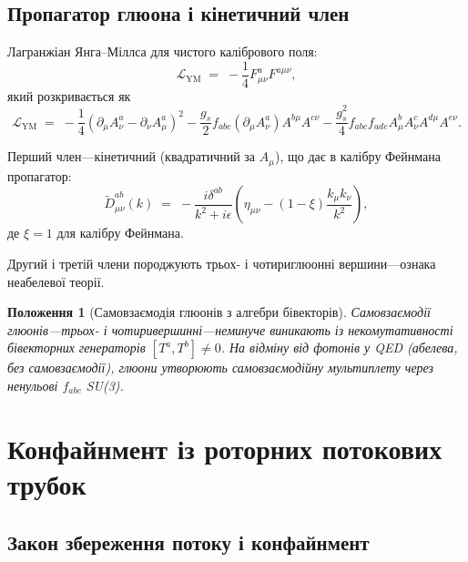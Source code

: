 \documentclass[11pt,a4paper]{article}
\newcommand{\Lag}{\mathcal{L}}
\theoremstyle{definition}
\theoremstyle{plain}
\newtheorem{proposition}{Положення}[section]
\theoremstyle{remark}
\begin{document}
\subsection{Пропагатор глюона і кінетичний член}

Лагранжіан Янга–Міллса для чистого калібрового поля:
\begin{equation}
\Lag_{\mathrm{YM}} \;=\; -\frac{1}{4}F_{\mu\nu}^a F^{a\mu\nu},
\label{eq:yang-mills-lagrangian}
\end{equation}
який розкривається як
\begin{equation}
\Lag_{\mathrm{YM}} \;=\; -\frac{1}{4}(\partial_\mu A_\nu^a - \partial_\nu A_\mu^a)^2 - \frac{g_s}{2}f_{abc}(\partial_\mu A_\nu^a)A^{b\mu}A^{c\nu} - \frac{g_s^2}{4}f_{abc}f_{ade}A_\mu^b A_\nu^c A^{d\mu}A^{e\nu}.
\end{equation}

Перший член—кінетичний (квадратичний за $A_\mu$), що дає в калібру Фейнмана пропагатор:
\begin{equation}
\tilde{D}_{\mu\nu}^{ab}(k) \;=\; -\frac{i\delta^{ab}}{k^2 + i\epsilon}\left(\eta_{\mu\nu} - (1-\xi)\frac{k_\mu k_\nu}{k^2}\right),
\end{equation}
де $\xi=1$ для калібру Фейнмана.

Другий і третій члени породжують трьох- і чотириглюонні вершини—ознака неабелевої теорії.

\begin{proposition}[Самовзаємодія глюонів з алгебри бівекторів]
Самовзаємодії глюонів—трьох- і чотиривершинні—неминуче виникають із некомутативності бівекторних генераторів $[T^a,T^b]\neq 0$. На відміну від фотонів у QED (абелева, без самовзаємодії), глюони утворюють самовзаємодійну мультиплету через ненульові $f_{abc}$ SU(3).
\end{proposition}

\vspace{1em}

\section{Конфайнмент із роторних потокових трубок}
\label{sec:confinement}

\subsection{Закон збереження потоку і конфайнмент}
\end{document}
